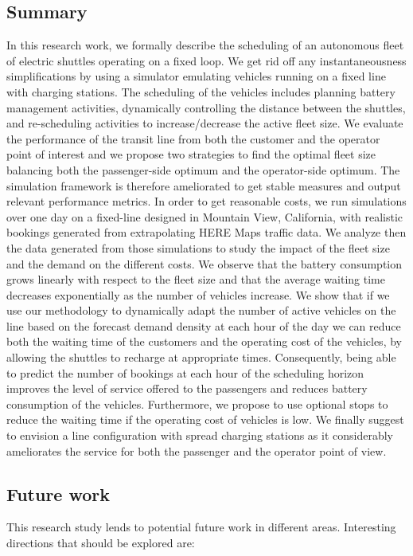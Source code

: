 \documentclass[12pt,a4paper]{article}
\begin{document}
\subsection{Summary}\label{summary}
In this research work, we formally describe the scheduling of an autonomous fleet of electric shuttles operating on a fixed loop. We get rid off any instantaneousness simplifications by using a simulator emulating vehicles running on a fixed line with charging stations. The scheduling of the vehicles includes planning battery management activities, dynamically controlling the distance between the shuttles, and re-scheduling activities to increase/decrease the active fleet size. We evaluate the performance of the transit line from both the customer and the operator point of interest and we propose two strategies to find the optimal fleet size balancing both the passenger-side optimum and the operator-side optimum. The simulation framework is therefore ameliorated to get stable measures and output relevant performance metrics. In order to get reasonable costs, we run simulations over one day on a fixed-line designed in Mountain View, California, with realistic bookings generated from extrapolating HERE Maps traffic data. We analyze then the data generated from those simulations to study the impact of the fleet size and the demand on the different costs. We observe that the battery consumption grows linearly with respect to the fleet size and that the average waiting time decreases exponentially as the number of vehicles increase. We show that if we use our methodology to dynamically adapt the number of active vehicles on the line based on the forecast demand density at each hour of the day we can reduce both the waiting time of the customers and the operating cost of the vehicles, by allowing the shuttles to recharge at appropriate times. Consequently, being able to predict the number of bookings at each hour of the scheduling horizon improves the level of service offered to the passengers and reduces battery consumption of the vehicles. Furthermore, we propose to use optional stops to reduce the waiting time if the operating cost of vehicles is low. We finally suggest to envision a line configuration with spread charging stations as it considerably ameliorates the service for both the passenger and the operator point of view.  

\subsection{Future work}\label{futurework}
This research study lends to potential future work in different areas. Interesting directions that should be explored are:
\end{document}
